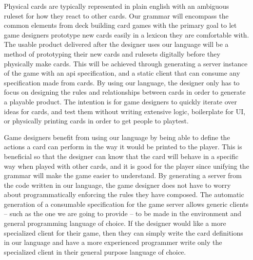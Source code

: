 \documentclass{acm_proc_article-sp}
\begin{document}
Physical cards are typically represented in plain english with an ambiguous ruleset 
for how they react to other cards. Our grammar will encompass the common elements from 
deck building card games with the primary goal to let game designers prototype new cards
easily in a lexicon they are comfortable with. The usable product delivered after the 
designer uses our language will be a method of prototyping their new cards and rulesets
digitally before they physically make cards. This will be achieved through generating a 
server instance of the game with an api specification, and a static client that can consume
any specification made from cards. By using our language, the designer only has to focus on
designing the rules and relationships between cards in order to generate a playable product.
The intention is for game designers to quickly iterate over ideas for cards, and test them 
without writing extensive logic, boilerplate for UI, or physically printing cards in order to 
get people to playtest.


Game designers benefit from using our language by being able to define the actions a card
can perform in the way it would be printed to the player. This is beneficial so that the designer
can know that the card will behave in a specific way when played with other cards, and it is good for
the player since unifying the grammar will make the game easier to understand. By generating a server
from the code written in our language, the game designer does not have to worry about programmatically 
enforcing the rules they have composed. The automatic generation of a consumable specification for the 
game server allows generic clients -- such as the one we are going to provide -- to be made in the environment
and general programming language of choice. If the designer would like a more specialized client for their game,
then they can simply write the card definitions in our language and have a more experienced programmer write
only the specialized client in their general purpose language of choice.
\end{document}
